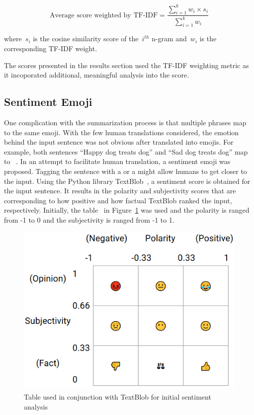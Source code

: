\documentclass{article}[10]
\newcommand*{\img}[1]{%
  \raisebox{-.3\baselineskip}{%
    \texttt{[image: \#1]}%
  }%
}
\begin{document}
\begin{equation}
  \textrm{Average score weighted by
    TF-IDF} = \frac{\sum_{i=1}^{k}w_{i}\times s_i}{\sum_{i=1}^{k}w_{i}}\label{eq:averageTF-IDFScore}
\end{equation}

where~\(s_{i}\) is the cosine similarity score of
the~\(i^{th}\) n-gram and~\(w_{i}\) is the
corresponding TF-IDF weight.

The scores presented in the results section used the TF-IDF weighting
metric as it incoporated additional, meaningful analysis into the
score.

\subsection{Sentiment Emoji\label{sec:sentimentEmoji}}

One complication with the summarization process is that multiple phrases
map to the same emoji. With the few human translations considered, the
emotion behind the input sentence was not obvious after translated into
emojis. For example, both sentences ``Happy dog treats dog'' and ``Sad
dog treats dog'' map to~\img{emojis/1f415.png}\img{emojis/1f368.png}\img{emojis/1f415.png}. In an attempt to facilitate human
translation, a sentiment emoji was proposed. Tagging the sentence with a
\img{emojis/1f60a.png} or a \img{emojis/1f641.png} might allow humans to get closer to the input. Using the Python
library TextBlob~\cite{TextBlob}, a sentiment score is obtained for
the input sentence. It results in the polarity and subjectivity scores
that are corresponding to how positive and how factual TextBlob ranked
the input, respectively. Initially, the table~\cite{TextBlob} in
Figure~\ref{fig:sentimentTable} was used and the polarity is
ranged from -1 to 0 and the subjectivity is ranged from -1 to 1.

\begin{figure}[H]
  \begin{center}
    \includegraphics[width=0.90\columnwidth]{figures/sentiment_table1.png}
    \caption{Table used in conjunction with TextBlob for initial sentiment
      analysis\label{fig:sentimentTable}}
  \end{center}
\end{figure}
\end{document}
